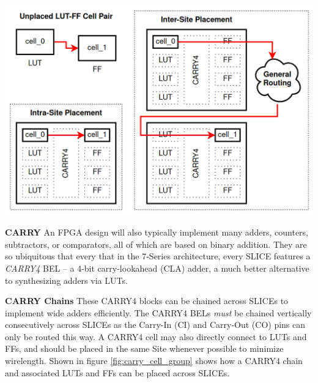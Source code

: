 \documentclass{article}
\begin{document}
\begin{multicols}{2}
        \vspace{1.0cm}
        {
            \centering
            \includegraphics[width=\columnwidth]{figures/intersite_intrasite_2.png}
            \label{fig:intersite_intrasite}
        }
        \vspace{1.0cm}


    \textbf{CARRY} \quad
        An FPGA design will also typically implement many adders, counters, subtractors, or comparators, all of which are based on binary addition. 
        They are so ubiquitous that every that in the 7-Series architecture, every SLICE features a \emph{CARRY4} BEL -- a 4-bit carry-lookahead (CLA) adder, a much better alternative to synthesizing adders via LUTs. 

    \textbf{CARRY Chains} \quad
        These CARRY4 blocks can be chained across SLICEs to implement wide adders efficiently. 
        The CARRY4 BELs \emph{must} be chained vertically consecutively across SLICEs as the Carry-In (CI) and Carry-Out (CO) pins can only be routed this way. 
        A CARRY4 cell may also directly connect to LUTs and FFs, and should be placed in the same Site whenever possible to minimize wirelength. 
        Shown in figure \ref{fig:carry_cell_group} shows how a CARRY4 chain and associated LUTs and FFs can be placed across SLICEs. 

        \end{multicols}
\end{document}
